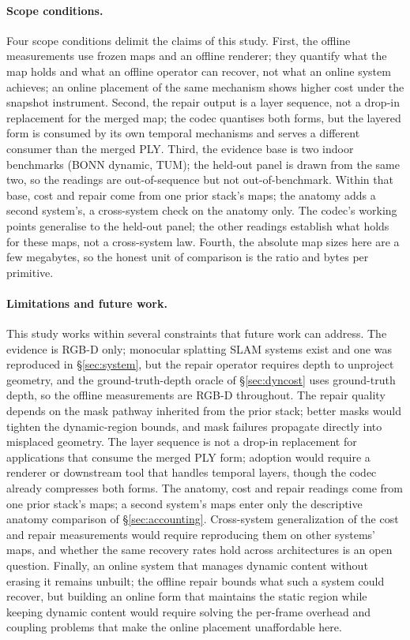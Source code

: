 \documentclass[10pt,twocolumn,letterpaper]{article}
\begin{document}
\paragraph{Scope conditions.}
Four scope conditions delimit the claims of this study. First, the offline measurements use frozen maps and an offline renderer; they
quantify what the map holds and what an offline operator can recover, not what an
online system achieves; an online placement of the same mechanism shows higher cost
under the snapshot instrument. Second, the repair output is a layer sequence, not a
drop-in replacement for the merged map; the codec quantises both forms, but the
layered form is consumed by its own temporal mechanisms and serves a different
consumer than the merged PLY. Third, the evidence base is two indoor benchmarks
(BONN dynamic, TUM); the held-out panel is drawn from the same two, so the readings
are out-of-sequence but not out-of-benchmark. Within that base, cost and repair come from
one prior stack's maps; the anatomy adds a second system's, a cross-system check on the
anatomy only. The codec's working points generalise to the held-out panel; the other
readings establish what holds for these maps, not a cross-system law. Fourth, the absolute
map sizes here are a few megabytes, so the honest unit of comparison is the ratio and bytes
per primitive.

\paragraph{Limitations and future work.}
This study works within several constraints that future work can address. The
evidence is RGB-D only; monocular splatting SLAM systems exist and one was reproduced
in \S\ref{sec:system}, but the repair operator requires depth to unproject geometry,
and the ground-truth-depth oracle of \S\ref{sec:dyncost} uses ground-truth depth, so the
offline measurements are RGB-D throughout. The repair quality depends on the mask
pathway inherited from the prior stack; better masks would tighten the dynamic-region
bounds, and mask failures propagate directly into misplaced geometry. The layer
sequence is not a drop-in replacement for applications that consume the merged PLY
form; adoption would require a renderer or downstream tool that handles temporal
layers, though the codec already compresses both forms. The anatomy, cost and repair
readings come from one prior stack's maps; a second system's maps enter only the descriptive
anatomy comparison of \S\ref{sec:accounting}. Cross-system generalization of the cost and
repair measurements would require reproducing them on other systems' maps, and whether the
same recovery rates hold across architectures is an open question. Finally, an online system
that manages dynamic content without erasing it remains unbuilt; the offline repair bounds
what such a system could recover, but building an online form that maintains the static
region while keeping dynamic content would require solving the per-frame overhead and
coupling problems that make the online placement unaffordable here.
\end{document}
